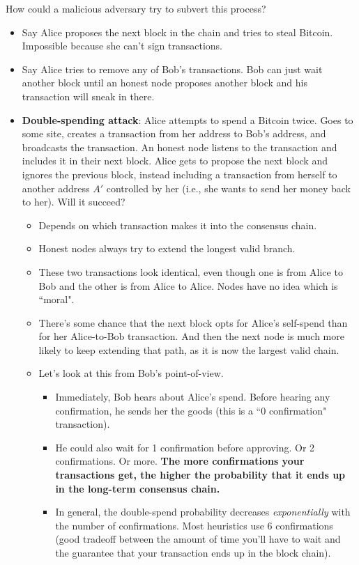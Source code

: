 \documentclass[12pt]{article}
\begin{document}
How could a malicious adversary try to subvert this process?
\begin{itemize}
\item Say Alice proposes the next block in the chain and tries to steal Bitcoin. Impossible because she can't sign transactions.
\item Say Alice tries to remove any of Bob's transactions. Bob can just wait another block until an honest node proposes another block and his transaction will sneak in there.
\item \textbf{Double-spending attack}: Alice attempts to spend a Bitcoin twice. Goes to some site, creates a transaction from her address to Bob's address, and broadcasts the transaction. An honest node listens to the transaction and includes it in their next block. Alice gets to propose the next block and ignores the previous block, instead including a transaction from herself to another address $A'$ controlled by her (i.e., she wants to send her money back to her). Will it succeed?
\begin{itemize}
\item Depends on which transaction makes it into the consensus chain.
\item Honest nodes always try to extend the longest valid branch.
\item These two transactions look identical, even though one is from Alice to Bob and the other is from Alice to Alice. Nodes have no idea which is ``moral".
\item There's some chance that the next block opts for Alice's self-spend than for her Alice-to-Bob transaction. And then the next node is much more likely to keep extending that path, as it is now the largest valid chain.
\item Let's look at this from Bob's point-of-view.
\begin{itemize}
\item Immediately, Bob hears about Alice's spend. Before hearing any confirmation, he sends her the goods (this is a ``0 confirmation" transaction).
\item He could also wait for 1 confirmation before approving. Or 2 confirmations. Or more. \textbf{The more confirmations your transactions get, the higher the probability that it ends up in the long-term consensus chain.}
\item In general, the double-spend probability decreases \textit{exponentially} with the number of confirmations. Most heuristics use 6 confirmations (good tradeoff between the amount of time you'll have to wait and the guarantee that your transaction ends up in the block chain).
\end{itemize}
\end{itemize}
\end{itemize}
\end{document}
